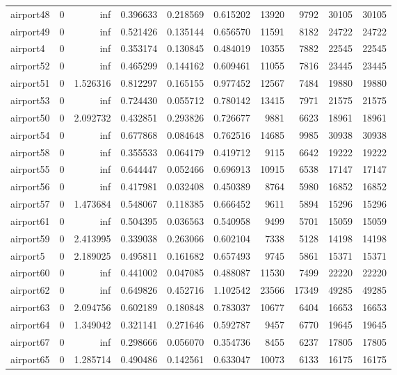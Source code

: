 \begin{longtable}{|l|r|r|r|r|r|r|r|r|r|}
airport48 & 0 & inf & 0.396633 & 0.218569 & 0.615202 & 13920 & 9792 & 30105 & 30105 \\
airport49 & 0 & inf & 0.521426 & 0.135144 & 0.656570 & 11591 & 8182 & 24722 & 24722 \\
airport4 & 0 & inf & 0.353174 & 0.130845 & 0.484019 & 10355 & 7882 & 22545 & 22545 \\
airport52 & 0 & inf & 0.465299 & 0.144162 & 0.609461 & 11055 & 7816 & 23445 & 23445 \\
airport51 & 0 & 1.526316 & 0.812297 & 0.165155 & 0.977452 & 12567 & 7484 & 19880 & 19880 \\
airport53 & 0 & inf & 0.724430 & 0.055712 & 0.780142 & 13415 & 7971 & 21575 & 21575 \\
airport50 & 0 & 2.092732 & 0.432851 & 0.293826 & 0.726677 & 9881 & 6623 & 18961 & 18961 \\
airport54 & 0 & inf & 0.677868 & 0.084648 & 0.762516 & 14685 & 9985 & 30938 & 30938 \\
airport58 & 0 & inf & 0.355533 & 0.064179 & 0.419712 & 9115 & 6642 & 19222 & 19222 \\
airport55 & 0 & inf & 0.644447 & 0.052466 & 0.696913 & 10915 & 6538 & 17147 & 17147 \\
airport56 & 0 & inf & 0.417981 & 0.032408 & 0.450389 & 8764 & 5980 & 16852 & 16852 \\
airport57 & 0 & 1.473684 & 0.548067 & 0.118385 & 0.666452 & 9611 & 5894 & 15296 & 15296 \\
airport61 & 0 & inf & 0.504395 & 0.036563 & 0.540958 & 9499 & 5701 & 15059 & 15059 \\
airport59 & 0 & 2.413995 & 0.339038 & 0.263066 & 0.602104 & 7338 & 5128 & 14198 & 14198 \\
airport5 & 0 & 2.189025 & 0.495811 & 0.161682 & 0.657493 & 9745 & 5861 & 15371 & 15371 \\
airport60 & 0 & inf & 0.441002 & 0.047085 & 0.488087 & 11530 & 7499 & 22220 & 22220 \\
airport62 & 0 & inf & 0.649826 & 0.452716 & 1.102542 & 23566 & 17349 & 49285 & 49285 \\
airport63 & 0 & 2.094756 & 0.602189 & 0.180848 & 0.783037 & 10677 & 6404 & 16653 & 16653 \\
airport64 & 0 & 1.349042 & 0.321141 & 0.271646 & 0.592787 & 9457 & 6770 & 19645 & 19645 \\
airport67 & 0 & inf & 0.298666 & 0.056070 & 0.354736 & 8455 & 6237 & 17805 & 17805 \\
airport65 & 0 & 1.285714 & 0.490486 & 0.142561 & 0.633047 & 10073 & 6133 & 16175 & 16175 \\

\end{longtable}
